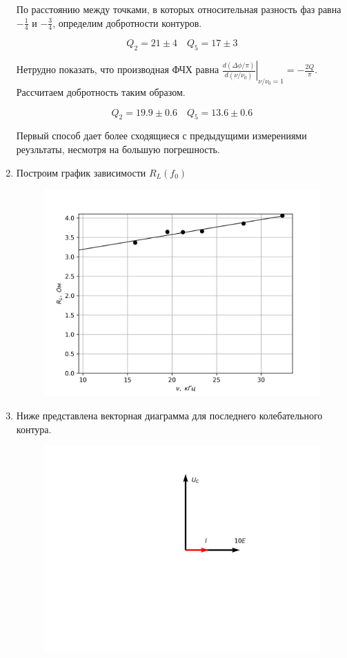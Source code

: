 \documentclass[14pt, a4paper]{report}
\begin{document}
\begin{enumerate}
По расстоянию между точками, в которых относительная разность фаз равна $-\frac{1}{4}$ и $-\frac{3}{4}$, определим добротности контуров.

\[Q_2=21\pm4\quad Q_5=17\pm3\]

Нетрудно показать, что производная ФЧХ равна $\left.\frac{d(\Delta\phi/\pi)}{d(\nu/\nu_0)}\right\vert_{\nu/\nu_0=1}=-\frac{2Q}{\pi}$. Рассчитаем добротность таким образом.

\[Q_2=19.9\pm0.6\quad Q_5=13.6\pm0.6\]

Первый способ дает более сходящиеся с предыдущими измерениями реузльтаты, несмотря на большую погрешность.

\item Построим график зависимости $R_L(f_0)$

\begin{figure}[H]
\centering
\includegraphics[scale=0.8]{images/322_4.png}
\end{figure}

\item Ниже представлена векторная диаграмма для последнего колебательного контура.

\begin{figure}[H]
\centering
\includegraphics[scale=0.6]{images/322_5.png}
\end{figure}


\end{enumerate}
\end{document}
